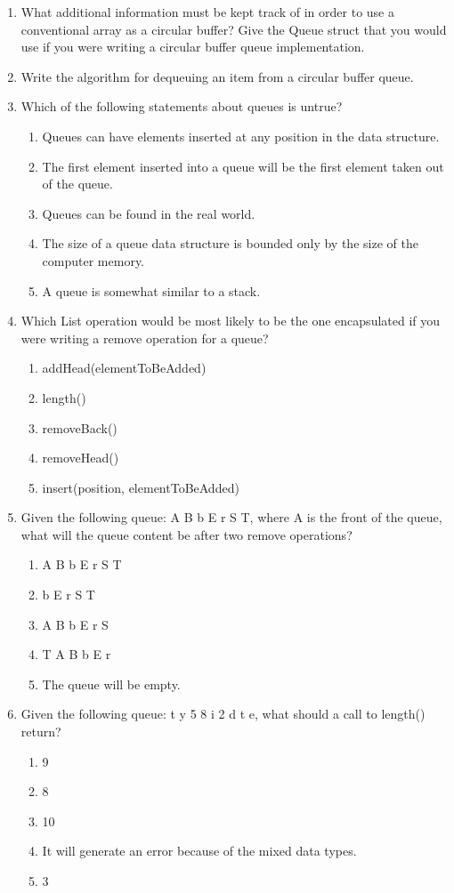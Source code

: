 \documentclass{article}
\begin{document}
\begin{enumerate}
	\item What additional information must be kept track of in order to use a conventional array as a circular buffer? Give the Queue struct that you would use if you were writing a circular buffer queue implementation.
	\vspace{4cm}
	\item Write the algorithm for dequeuing an item from a circular buffer queue.
	\vspace{4cm}
	\item Which of the following statements about queues is untrue?
		\begin{enumerate}[label=\alph*.]
			\item Queues can have elements inserted at any position in the data structure.
			\item The first element inserted into a queue will be the first element taken out of the queue.
			\item Queues can be found in the real world.
			\item The size of a queue data structure is bounded only by the size of the computer memory.
			\item A queue is somewhat similar to a stack.
		\end{enumerate}
	\item Which List operation would be most likely to be the one encapsulated if you were writing a remove operation for a queue?
		\begin{enumerate}[label=\alph*.]
			\item addHead(elementToBeAdded)
			\item length()
			\item removeBack()
			\item removeHead()
			\item insert(position, elementToBeAdded)
		\end{enumerate}
	\item Given the following queue: A B b E r S T, where A is the front of the queue, what will the queue content be after two remove operations?
		\begin{enumerate}[label=\alph*.]
			\item A B b E r S T
			\item b E r S T
			\item A B b E r S
			\item T A B b E r
			\item The queue will be empty.
		\end{enumerate}
	\newpage
	\item Given the following queue: t y 5 8 i 2 d t e, what should a call to length() return?
		\begin{enumerate}[label=\alph*.]
			\item 9
			\item 8
			\item 10
			\item It will generate an error because of the mixed data types.
			\item 3
		\end{enumerate}
\end{enumerate}
\end{document}
